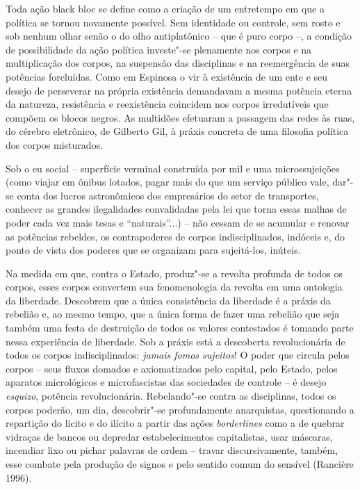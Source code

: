 Toda ação black bloc se define como a criação de um entretempo em
que a política se tornou novamente possível. Sem identidade ou controle,
sem rosto e sob nenhum olhar senão o do olho antiplatônico -- que é puro
corpo --, a condição de possibilidade da ação política investe"-se
plenamente nos corpos e na multiplicação dos corpos, na suspensão das
disciplinas e na reemergência de suas potências forcluídas. Como em
Espinosa o vir à existência de um ente e seu desejo de perseverar na
própria existência demandavam a mesma potência eterna da natureza,
resistência e reexistência coincidem nos corpos irredutíveis que compõem
os blocos negros. As multidões efetuaram a passagem das redes às ruas,
do cérebro eletrônico, de Gilberto Gil, à práxis concreta de uma
filosofia política dos corpos misturados.

Sob o eu social -- superfície verminal construída por mil e uma
microssujeições (como viajar em ônibus lotados, pagar mais do que um
serviço público vale, dar"-se conta dos lucros astronômicos dos
empresários do setor de transportes, conhecer as grandes ilegalidades
convalidadas pela lei que torna essas malhas de poder cada vez mais
tesas e ``naturais''...) -- não cessam de se acumular e renovar as
potências rebeldes, os contrapoderes de corpos indisciplinados, indóceis
e, do ponto de vista dos poderes que se organizam para sujeitá-los,
inúteis.

Na medida em que, contra o Estado, produz"-se a revolta profunda de todos
os corpos, esses corpos convertem sua fenomenologia da revolta em uma
ontologia da liberdade. Descobrem que a única consistência da liberdade
é a práxis da rebelião e, ao mesmo tempo, que a única forma de fazer uma
rebelião que seja também uma festa de destruição de todos os valores
contestados é tomando parte nessa experiência de liberdade. Sob a práxis
está a descoberta revolucionária de todos os corpos indisciplinados:
\emph{jamais fomos sujeitos}! O poder que circula pelos corpos -- seus
fluxos domados e axiomatizados pelo capital, pelo Estado, pelos aparatos
micrológicos e microfascistas das sociedades de controle -- é desejo
\emph{esquizo}, potência revolucionária. Rebelando"-se contra as
disciplinas, todos os corpos poderão, um dia, descobrir"-se profundamente
anarquistas, questionando a repartição do lícito e do ilícito a partir
das ações \emph{borderlines }como a de quebrar vidraças de bancos ou
depredar estabelecimentos capitalistas, usar máscaras, incendiar lixo ou
pichar palavras de ordem -- travar discursivamente, também, esse combate
pela produção de signos e pelo sentido comum do sensível (Rancière
1996).

